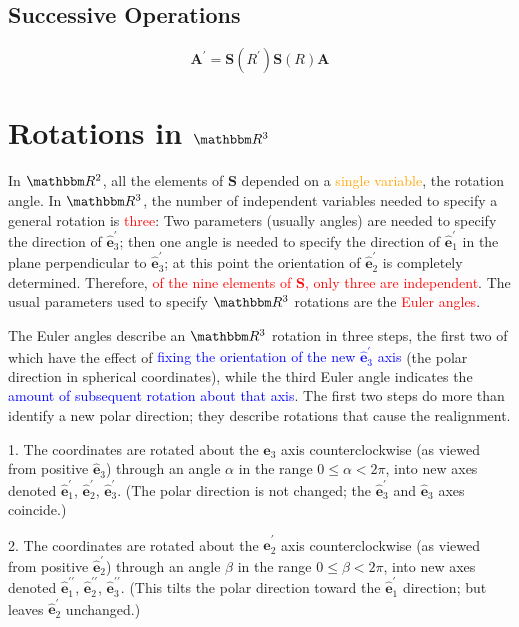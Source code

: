 \documentclass[11pt,a4paper]{article}
\renewcommand{\vec}[1]{\boldsymbol{#1}}
\begin{document}
\subsection{Successive Operations}

\begin{equation}
\vec{A}^\prime = \vec{S}(R^\prime) \vec{S}(R) \vec{A} 
\end{equation}




\section{Rotations in $\mathbbm R^3$}

In $\mathbbm R^2$, all the elements of $\vec{S}$ depended on a \textcolor{orange}{single variable}, the rotation angle. In $\mathbbm R^3$, the number of independent variables needed to specify a general rotation is \textcolor{red}{three}: Two parameters (usually angles) are needed to specify the direction of $\mathbf{\hat{e}}^\prime_3$; then one angle is needed to specify the direction of $\mathbf{\hat{e}}^\prime_1$ in the plane perpendicular to $\mathbf{\hat{e}}^\prime_3$; at this point the orientation of $\mathbf{\hat{e}}^\prime_2$ is completely determined. Therefore, \textcolor{red}{of the nine elements of $\vec{S}$, only three are independent}. The usual parameters used to specify $\mathbbm R^3$ rotations are the \textcolor{red}{Euler angles}.

The Euler angles describe an $\mathbbm R^3$ rotation in three steps, the first two of which have the effect of \textcolor{blue}{fixing the orientation of the new $\mathbf{\hat{e}}^\prime_3$ axis} (the polar direction in spherical coordinates), while the third Euler angle indicates the \textcolor{blue}{amount of subsequent rotation about that axis}. The first two steps do more than identify a new polar direction; they describe rotations that cause the realignment. 


1. The coordinates are rotated about the $\mathbf{\hat{e}}_3$ axis counterclockwise (as viewed from positive $\mathbf{\hat{e}}_3$) through an angle $\alpha$ in the range $0 \leqslant \alpha < 2\pi$, into new axes denoted $\mathbf{\hat{e}}^\prime_1$, $\mathbf{\hat{e}}^\prime_2$, $\mathbf{\hat{e}}^\prime_3$. (The polar direction is not changed; the $\mathbf{\hat{e}}^\prime_3$ and $\mathbf{\hat{e}}_3$ axes coincide.)

2. The coordinates are rotated about the $\mathbf{\hat{e}}^\prime_2$ axis counterclockwise (as viewed from positive $\mathbf{\hat{e}}^\prime_2$) through an angle $\beta$ in the range $0 \leqslant \beta < 2\pi$, into new axes denoted $\mathbf{\hat{e}}^{\prime\prime}_1$, $\mathbf{\hat{e}}^{\prime\prime}_2$, $\mathbf{\hat{e}}^{\prime\prime}_3$. (This tilts the polar direction toward the $\mathbf{\hat{e}}^{\prime}_1$ direction; but leaves $\mathbf{\hat{e}}^{\prime}_2$ unchanged.)
\end{document}
